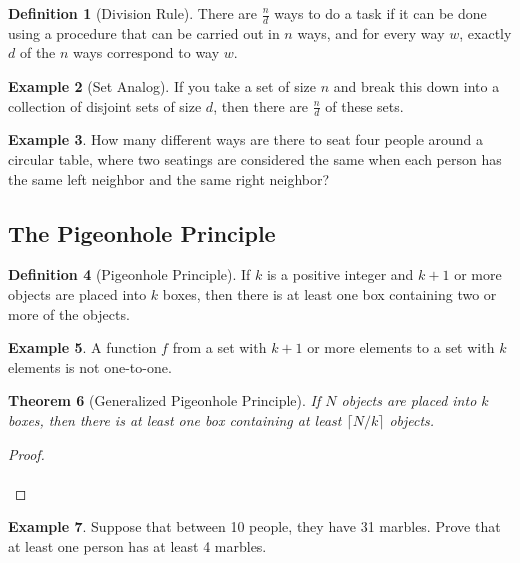 \documentclass[letterpaper,10pt]{article}
\theoremstyle{plain}
\newtheorem{thm}{Theorem}[section]
\theoremstyle{definition}
\newtheorem{defn}[thm]{Definition}
\newtheorem{exmp}[thm]{Example}
\theoremstyle{remark}
\begin{document}
\begin{defn}[Division Rule]
    There are $\frac{n}{d}$ ways to do a task if it can be done using a procedure that can be carried out in $n$ ways, and for every way $w$, exactly $d$ of the $n$ ways correspond to way $w$.
\end{defn}
\begin{exmp}[Set Analog]
If you take a set of size $n$ and break this down into a collection of disjoint sets of size $d$, then there are $\frac{n}{d}$ of these sets.

\end{exmp}
\begin{exmp}
    How many different ways are there to seat four people around a circular table, where two seatings are considered the same when each person has the same left neighbor and the same right neighbor?

    \vspace{2cm}
\end{exmp}
\subsection{The Pigeonhole Principle}

\begin{defn}[Pigeonhole Principle]
    If $k$ is a positive integer and $k + 1$ or more objects are placed into $k$ boxes, then there is at least one box containing two or more of the objects.
\end{defn}
\begin{exmp}

    A function $f$ from a set with $k + 1$ or more elements to a set with $k$ elements is not one-to-one.

\end{exmp}
\begin{thm}[Generalized Pigeonhole Principle]
    If $N$ objects are placed into $k$ boxes, then there is at least one box containing at least $\lceil N/k \rceil$ objects.
\end{thm}
\begin{proof} $ $\\
\vspace{4cm}
$ $\\
\end{proof}

\begin{exmp} Suppose that between 10 people, they have 31 marbles. Prove that at least one person has at least 4 marbles.
\vspace{2cm}
\end{exmp}
\end{document}
